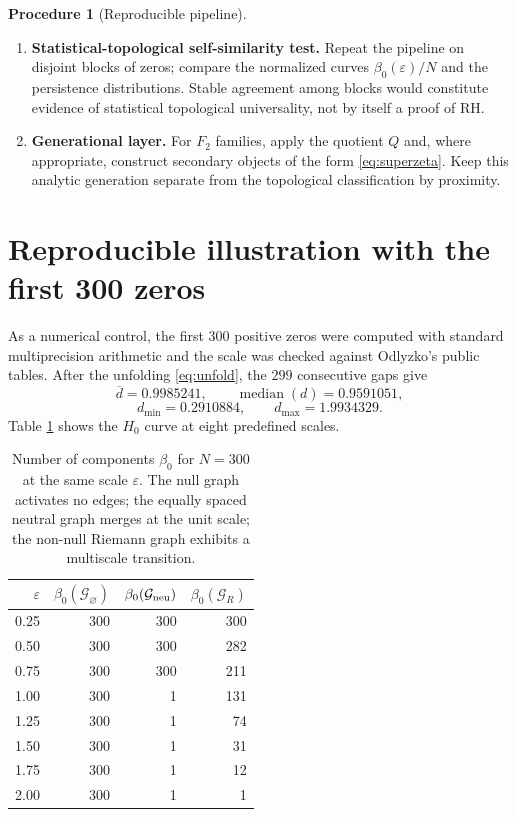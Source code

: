 \documentclass[11pt]{amsart}
\theoremstyle{definition}
\newtheorem{algorithmicdef}[theorem]{Procedure}
\theoremstyle{remark}
\begin{document}
\begin{algorithmicdef}[Reproducible pipeline]
\begin{enumerate}[label=\textbf{Step \arabic*.},leftmargin=*]
\[
\mathcal B_{\varnothing}(\varepsilon),\quad
\mathcal B_{\rm neu}(\varepsilon),\quad
\mathcal B_R(\varepsilon),
\]
where $\mathcal B=\beta_0$.
\item \textbf{Statistical-topological self-similarity test.} Repeat the pipeline on disjoint blocks of zeros; compare the normalized curves $\beta_0(\varepsilon)/N$ and the persistence distributions. Stable agreement among blocks would constitute evidence of statistical topological universality, not by itself a proof of RH.
\item \textbf{Generational layer.} For $F_2$ families, apply the quotient $Q$ and, where appropriate, construct secondary objects of the form \eqref{eq:superzeta}. Keep this analytic generation separate from the topological classification by proximity.
\end{enumerate}
\end{algorithmicdef}

\section{Reproducible illustration with the first 300 zeros}
As a numerical control, the first $300$ positive zeros were computed with standard multiprecision arithmetic and the scale was checked against Odlyzko's public tables. After the unfolding \eqref{eq:unfold}, the $299$ consecutive gaps give
\begin{equation}
 \overline d=0.9985241,\qquad
 \operatorname{median}(d)=0.9591051,
\end{equation}
\begin{equation}
 d_{\min}=0.2910884,\qquad d_{\max}=1.9934329.
\end{equation}
Table \ref{tab:beta} shows the $H_0$ curve at eight predefined scales.

\begin{table}[t]
\centering
\caption{Number of components $\beta_0$ for $N=300$ at the same scale $\varepsilon$. The null graph activates no edges; the equally spaced neutral graph merges at the unit scale; the non-null Riemann graph exhibits a multiscale transition.}
\label{tab:beta}
\begin{tabular}{rrrr}
\toprule
$\varepsilon$ & $\beta_0(\mathcal G_{\varnothing})$ & $\beta_0(\mathcal G_{\rm neu})$ & $\beta_0(\mathcal G_R)$\\
\midrule
0.25 & 300 & 300 & 300\\
0.50 & 300 & 300 & 282\\
0.75 & 300 & 300 & 211\\
1.00 & 300 & 1   & 131\\
1.25 & 300 & 1   & 74\\
1.50 & 300 & 1   & 31\\
1.75 & 300 & 1   & 12\\
2.00 & 300 & 1   & 1\\
\bottomrule
\end{tabular}
\end{table}
\end{document}
